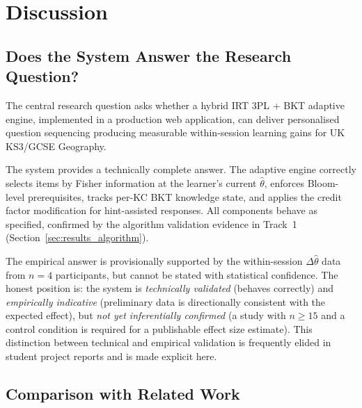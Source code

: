 \chapter{Discussion}
\label{ch:discussion}

\section{Does the System Answer the Research Question?}
\label{sec:disc_rq}

The central research question asks whether a hybrid IRT 3PL + BKT adaptive
engine, implemented in a production web application, can deliver personalised
question sequencing producing measurable within-session learning gains for UK
KS3/GCSE Geography.

The system provides a technically complete answer. The adaptive engine correctly
selects items by Fisher information at the learner's current $\hat{\theta}$,
enforces Bloom-level prerequisites, tracks per-KC BKT knowledge state, and
applies the credit factor modification for hint-assisted responses. All
components behave as specified, confirmed by the algorithm validation evidence
in Track~1 (Section~\ref{sec:results_algorithm}).

The empirical answer is provisionally supported by the within-session
$\Delta\hat{\theta}$ data from $n = 4$ participants, but cannot be stated with
statistical confidence. The honest position is: the system is \textit{technically
validated} (behaves correctly) and \textit{empirically indicative} (preliminary
data is directionally consistent with the expected effect), but \textit{not
yet inferentially confirmed} (a study with $n \geq 15$ and a control condition
is required for a publishable effect size estimate). This distinction between
technical and empirical validation is frequently elided in student project
reports and is made explicit here.

\section{Comparison with Related Work}
\label{sec:disc_comparison}

